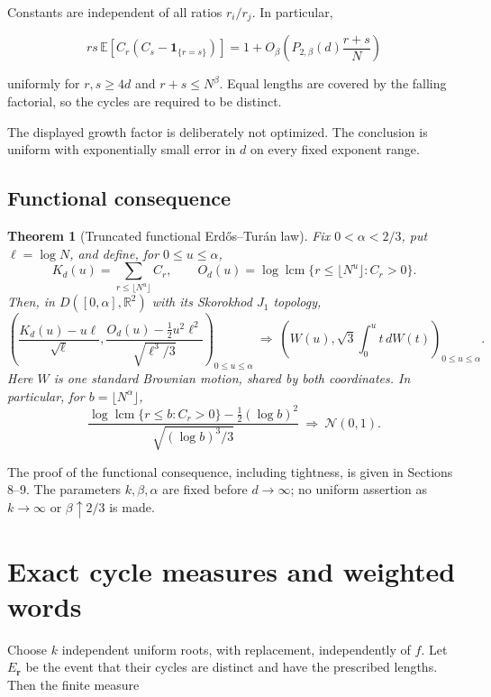 \documentclass[11pt]{article}
\newtheorem{theorem}{Theorem}[section]
\theoremstyle{remark}
\begin{document}
Constants are independent of all ratios \(r_i/r_j\). In particular,

\[
 rs\,\mathbb E[C_r(C_s-\mathbf1_{\{r=s\}})]
 =1+O_\beta\!\left(P_{2,\beta}(d)\frac{r+s}{N}\right)
\]

uniformly for \(r,s\ge4d\) and \(r+s\le N^\beta\). Equal lengths are
covered by the falling factorial, so the cycles are required to be
distinct.

The displayed growth factor is deliberately not optimized. The
conclusion is uniform with exponentially small error in \(d\) on every
fixed exponent range.

\subsection{Functional consequence}\label{functional-consequence}

\begin{theorem}[Truncated functional Erd\H{o}s--Tur\'{a}n law]\label{thm:functional}
Fix $0<\alpha<2/3$, put $\ell=\log N$, and define, for $0\le u\le\alpha$,
\[
 K_d(u)=\sum_{r\le\lfloor N^u\rfloor}C_r,
 \qquad
 O_d(u)=\log\operatorname{lcm}\{r\le\lfloor N^u\rfloor:C_r>0\}.
\]
Then, in $D([0,\alpha],\mathbb R^2)$ with its Skorokhod $J_1$ topology,
\[
 \left(
 \frac{K_d(u)-u\ell}{\sqrt\ell},
 \frac{O_d(u)-\tfrac12u^2\ell^2}{\sqrt{\ell^3/3}}
 \right)_{0\le u\le\alpha}
 \ \Longrightarrow\
 \left(W(u),\sqrt3\int_0^u t\,dW(t)\right)_{0\le u\le\alpha}.
 \tag{1.3}\label{eq:1.3}
\]
Here $W$ is one standard Brownian motion, shared by both coordinates. In
particular, for $b=\lfloor N^\alpha\rfloor$,
\[
 \frac{\log\operatorname{lcm}\{r\le b:C_r>0\}
       -\tfrac12(\log b)^2}{\sqrt{(\log b)^3/3}}
 \ \Longrightarrow\ \mathcal N(0,1).
 \tag{1.4}\label{eq:1.4}
\]
\end{theorem}



The proof of the functional consequence, including tightness, is given
in Sections 8--9. The parameters \(k,\beta,\alpha\) are fixed before
\(d\to\infty\); no uniform assertion as \(k\to\infty\) or
\(\beta\uparrow2/3\) is made.

\section{Exact cycle measures and weighted
words}\label{exact-cycle-measures-and-weighted-words}

Choose \(k\) independent uniform roots, with replacement, independently
of \(f\). Let \(E_{\mathbf r}\) be the event that their cycles are
distinct and have the prescribed lengths. Then the finite measure
\end{document}
